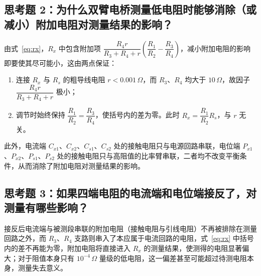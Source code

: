 \documentclass{Phyport}
\begin{document}
\subsection*{思考题 2：为什么双臂电桥测量低电阻时能够消除（或减小）附加电阻对测量结果的影响？}

由式~\eqref{eq:rx}，$R_x$ 中包含附加项 $\dfrac{R_4r}{R_3+R_4+r}\left(\dfrac{R_1}{R_2}-\dfrac{R_3}{R_4}\right)$，减小附加电阻的影响即要使其尽可能小，这由两点保证：

\begin{enumerate}
    \item 连接 $R_x$ 与 $R_s$ 的粗导线电阻 $r<0.001\,\Omega$，而 $R_3$、$R_4$ 均大于 $10\,\Omega$，故因子 $\dfrac{R_4r}{R_3+R_4+r}$ 极小；
    \item 调节时始终保持 $\dfrac{R_1}{R_2}=\dfrac{R_3}{R_4}$，使括号内的差为零。此时 $R_x=\dfrac{R_1}{R_2}R_s$，与 $r$ 无关。
\end{enumerate}

此外，电流端 $C_{x1}$、$C_{x2}$、$C_{s1}$、$C_{s2}$ 处的接触电阻只与电源回路串联，电位端 $P_{x1}$、$P_{x2}$、$P_{s1}$、$P_{s2}$ 处的接触电阻只与高阻值的比率臂串联，二者均不改变平衡条件，从而消除了附加电阻对测量结果的影响。

\subsection*{思考题 3：如果四端电阻的电流端和电位端接反了，对测量有哪些影响？}

接反后电流端与被测段串联的附加电阻（接触电阻与引线电阻）不再被排除在测量回路之外，而 $R_3$、$R_4$ 支路则串入了本应属于电流回路的电阻，式~\eqref{eq:rx} 中括号内的差不再能为零，附加电阻将直接进入 $R_x$ 的测量结果，使测得的电阻显著偏大；对于阻值本身只有 $10^{-4}\,\Omega$ 量级的低电阻，这一偏差甚至可能超过待测电阻本身，测量失去意义。


\end{document}
